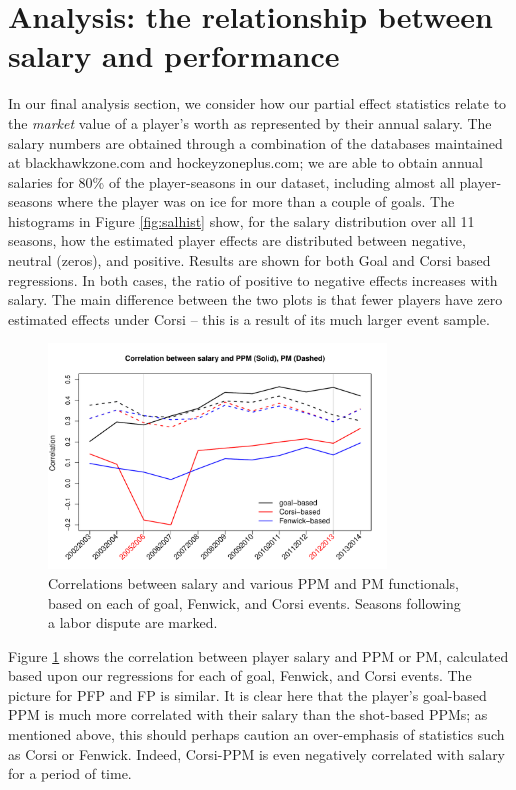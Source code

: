 \section{Analysis: the relationship between salary and performance}
\label{sec:salary}

In our final analysis section, we consider how our partial effect statistics
relate to the \textit{market} value of a player's worth as represented by
their annual salary.  The salary numbers are obtained through a combination of
the databases maintained at {\sf blackhawkzone.com} and {\sf
hockeyzoneplus.com}; we are able to obtain annual salaries for 80\%
of the player-seasons in our dataset, including almost all player-seasons
where the player was on ice for more than a couple of goals. The histograms in
Figure \ref{fig:salhist} show, for the salary distribution over all 11
seasons, how the estimated player effects are distributed between negative,
neutral (zeros), and positive.  Results are shown for both Goal and Corsi
based regressions.  In both cases, the ratio of positive to negative effects
increases with salary.  The main difference between the two plots is that
fewer players have zero estimated effects under Corsi -- this is a result of
its much larger event sample.


\begin{figure}[htb!]
	\centering
	\includegraphics[width=0.8\textwidth]{figures/ppmpmsal-corr-regular.pdf}
	\caption{Correlations between salary and various PPM and PM functionals, based on each of goal, Fenwick, and Corsi events.  Seasons following a labor dispute are marked. }\label{fig:salarycorr}
\end{figure}

Figure \ref{fig:salarycorr} shows the correlation between player salary and PPM or PM, calculated based upon our regressions for each of goal, Fenwick, and Corsi events.  The picture for PFP and FP is similar.  It is clear here that the player's goal-based PPM is much more correlated with their salary than the shot-based PPMs; as mentioned above, this should perhaps caution an over-emphasis of statistics such as Corsi or Fenwick.  Indeed, Corsi-PPM is even negatively correlated with salary for a period of time.


